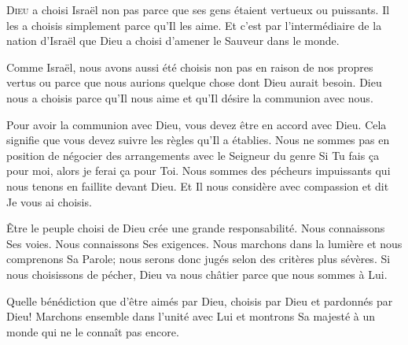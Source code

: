 \dvrule







\lettrine{D}{ieu} a choisi Israël \ocadr non pas parce que ses gens
 étaient vertueux ou puissants. Il les a choisis simplement parce
 qu'Il les aime. Et c'est par l'intermédiaire de la nation d'Israël
 que Dieu a choisi d'amener le Sauveur dans le monde. 

Comme Israël, nous avons aussi été choisis non pas en raison de nos propres
 vertus ou parce que nous aurions quelque chose dont Dieu aurait besoin.
 Dieu nous a choisis parce qu'Il nous aime et qu'Il désire
 la communion avec nous. 


Pour avoir la communion avec Dieu, vous devez être en accord avec Dieu.
 Cela signifie que vous devez suivre les règles qu'Il a établies.
 Nous ne sommes pas en position de négocier des arrangements
 avec le Seigneur du genre\frcolon{}
 \Og Si Tu fais \c{c}a pour moi, alors je ferai \c{c}a pour Toi. \Fg{}
 Nous sommes des pécheurs impuissants qui nous tenons en faillite devant Dieu.
 Et Il nous considère avec compassion et dit\frcolon{} 
 \Og Je vous ai choisis. \Fg{}

Être le peuple choisi de Dieu crée une grande responsabilité.
 Nous connaissons Ses voies. Nous connaissons Ses exigences.
 Nous marchons dans la lumière et nous comprenons Sa Parole;
 nous serons donc jugés selon des critères plus sévères.
 Si nous choisissons de pécher, Dieu va nous châtier
 parce que nous sommes à Lui. 

Quelle bénédiction que d'être aimés par Dieu,
 choisis par Dieu et pardonnés par Dieu!
 Marchons ensemble dans l'unité avec Lui et montrons Sa majesté
 à un monde qui ne le connaît pas encore. 

